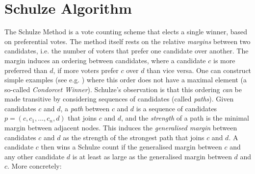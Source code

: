 %  


\section{Schulze Algorithm}
\label{sec:schulze_algorithm}
The Schulze Method \citep{Schulze:2011:NMC} is a vote counting scheme
that elects a single winner, based on preferential votes. 
The method itself rests on the relative 
\emph{margins} between two candidates, i.e. the number of
voters that prefer one candidate over another.  The margin induces
an ordering between candidates, where a candidate $c$ is more
preferred than $d$, if more voters prefer $c$ over $d$ than 
vice versa. One can construct simple examples (see e.g.
\citep{Rivest:2010:OSW}) where this order does not have a maximal
element (a so-called \emph{Condorcet Winner}). Schulze's observation
is that this ordering \emph{can} be made transitive by considering
sequences of candidates (called \emph{paths}). Given candidates $c$
and $d$, a \emph{path} between $c$ and $d$ is a sequence of candidates
 $p = (c, c_1,\dots, c_n, d)$ that joins $c$ and $d$, and 
 the \emph{strength} of a
path is the minimal margin between adjacent nodes. This induces the
\emph{generalised margin} between candidates $c$ and $d$ as the
strength of the strongest path that joins $c$ and $d$. A candidate
$c$ then wins a Schulze count if the generalised margin between $c$
and any other candidate $d$ is at least as large as the generalised
margin between $d$ and $c$. More concretely:


